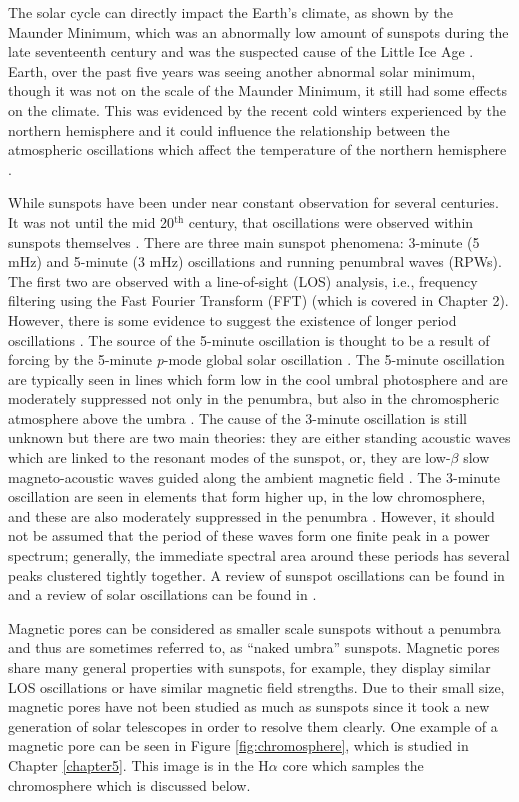     The solar cycle can directly impact the Earth's climate, as shown by the Maunder Minimum, which was an abnormally low amount of sunspots during the late seventeenth century and was the suspected cause of the Little Ice Age \citep{climate}.
    Earth, over the past five years was seeing another abnormal solar minimum, though it was not on the scale of the Maunder Minimum, it still had some effects on the climate.
    This was evidenced by the recent cold winters experienced by the northern hemisphere and it could influence the relationship between the atmospheric oscillations which affect the temperature of the northern hemisphere \citep{CWE,NAO,SCR}. 
   
    While sunspots have been under near constant observation for several centuries.
    It was not until the mid 20$^{\mathrm{th}}$ century, that oscillations were observed within sunspots themselves \citep{OASO}.
    There are three main sunspot phenomena: 3-minute (5 mHz) and 5-minute (3 mHz) oscillations and running penumbral waves (RPWs).
    The first two are observed with a line-of-sight (LOS) analysis, i.e., frequency filtering using the Fast Fourier Transform (FFT) (which is covered in Chapter 2).
    However, there is some evidence to suggest the existence of longer period oscillations \citep{LPO,SOS,Chorley2011}.
    The source of the 5-minute oscillation is thought to be a result of forcing by the 5-minute \textit{p}-mode global solar oscillation \citep{OWS,WAUO}.
    The 5-minute oscillation are typically seen in lines which form low in the cool umbral photosphere and are moderately suppressed not only in the penumbra, but also in the chromospheric atmosphere above the umbra \citep{OASO}.
    The cause of the 3-minute oscillation is still unknown but there are two main theories: they are either standing acoustic waves which are linked to the resonant modes of the sunspot, or, they are low-$\beta$ slow magneto-acoustic waves guided along the ambient magnetic field \citep{UTMO,OWS,OASO,ORWS}.
    The 3-minute oscillation are seen in elements that form higher up, in the low chromosphere, and these are also moderately suppressed in the penumbra \citep{OASO}.
    However, it should not be assumed that the period of these waves form one finite peak in a power spectrum; generally, the immediate spectral area around these periods has several peaks clustered tightly together.
    A review of sunspot oscillations can be found in \cite{OASO} and a review of solar oscillations can be found in \cite{SO}.

    Magnetic pores can be considered as smaller scale sunspots without a penumbra and thus are sometimes referred to, as ``naked umbra'' sunspots.
    Magnetic pores share many general properties with sunspots, for example, they display similar LOS oscillations or have similar magnetic field strengths.
    Due to their small size, magnetic pores have not been studied as much as sunspots since it took a new generation of solar telescopes in order to resolve them clearly.
    One example of a magnetic pore can be seen in Figure \ref{fig:chromosphere}, which is studied in Chapter \ref{chapter5}.
    This image is in the H$\alpha$ core which samples the chromosphere which is discussed below.
        
